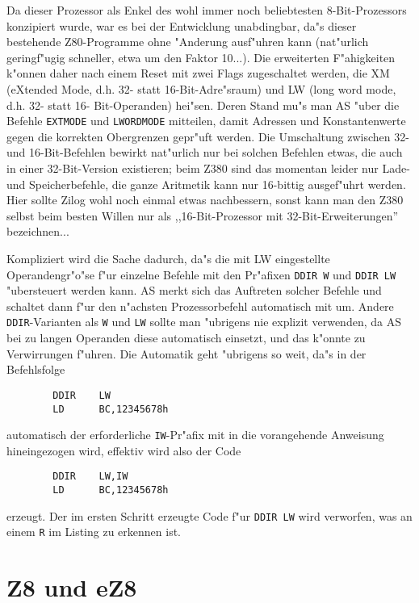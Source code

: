 \documentclass[12pt,a4paper,twoside]{report}
\newcommand{\tty}[1]{{\tt #1}}
\begin{document}
{Da dieser Prozessor als Enkel des wohl immer noch beliebtesten
8-Bit-Prozessors konzipiert wurde, war es bei der Entwicklung
unabdingbar, da"s dieser bestehende Z80-Programme ohne "Anderung
ausf"uhren kann (nat"urlich geringf"ugig schneller, etwa um den
Faktor 10...).  Die erweiterten F"ahigkeiten k"onnen daher nach
einem Reset mit zwei Flags zugeschaltet werden, die XM (eXtended
Mode, d.h. 32- statt 16-Bit-Adre"sraum) und LW (long word mode,
d.h. 32- statt 16- Bit-Operanden) hei"sen.  Deren Stand mu"s man
AS "uber die Befehle \tty{EXTMODE} und \tty{LWORDMODE} mitteilen, damit
Adressen und Konstantenwerte gegen die korrekten Obergrenzen
gepr"uft werden.  Die Umschaltung zwischen 32- und 16-Bit-Befehlen
bewirkt nat"urlich nur bei solchen Befehlen etwas, die auch in
einer 32-Bit-Version existieren; beim Z380 sind das momentan
leider nur Lade- und Speicherbefehle, die ganze Aritmetik kann
nur 16-bittig ausgef"uhrt werden.  Hier sollte Zilog wohl noch
einmal etwas nachbessern, sonst kann man den Z380 selbst beim
besten Willen nur als ,,16-Bit-Prozessor mit 32-Bit-Erweiterungen''
bezeichnen...

Kompliziert wird die Sache dadurch, da"s die mit LW eingestellte
Operandengr"o"se f"ur einzelne Befehle mit den Pr"afixen \tty{DDIR W}
und \tty{DDIR LW} "ubersteuert werden kann.  AS merkt sich das
Auftreten solcher Befehle und schaltet dann f"ur den n"achsten
Prozessorbefehl automatisch mit um.  Andere \tty{DDIR}-Varianten
als \tty{W} und \tty{LW} sollte man "ubrigens nie explizit
verwenden, da AS bei zu langen Operanden diese automatisch
einsetzt, und das k"onnte zu Verwirrungen f"uhren.  Die Automatik
geht "ubrigens so weit, da"s in der Befehlsfolge
\begin{verbatim}
        DDIR    LW
        LD      BC,12345678h
\end{verbatim}
automatisch der erforderliche \tty{IW}-Pr"afix mit in die
vorangehende Anweisung hineingezogen wird, effektiv wird also
der Code
\begin{verbatim}
        DDIR    LW,IW
        LD      BC,12345678h
\end{verbatim}
erzeugt.  Der im ersten Schritt erzeugte Code f"ur \tty{DDIR LW}
wird verworfen, was an einem \tty{R} im Listing zu erkennen
ist.


\section{Z8 und eZ8}
\label{Z8Spec}

}
\end{document}

